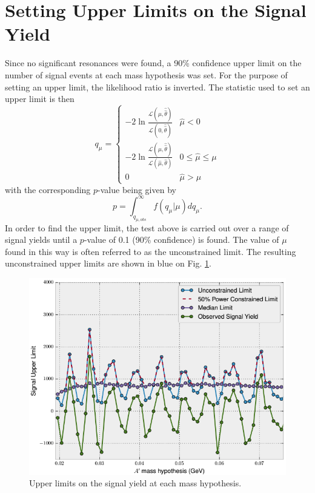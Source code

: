 \section{Setting Upper Limits on the Signal Yield}

Since no significant resonances were found, a 90\% confidence upper limit on the number
of signal events at each mass hypothesis was set.  For the purpose of setting
an upper limit, the likelihood ratio is inverted.  The statistic used
to set an upper limit is then
\begin{equation}
    q_{\mu} = \begin{cases}
        -2 \ln \frac{\mathcal{L}(\mu, \hat{\hat{\theta}})}{\mathcal{L}(0, \hat{\hat{\theta}})} 
            & \hat{\mu} < 0 \\
        -2 \ln \frac{\mathcal{L}(\mu, \hat{\hat{\theta}})}{\mathcal{L}(\hat{\mu}, \hat{\theta})} 
            & 0 \leq \hat{\mu} \leq \mu \\
             0  & \hat{\mu} > \mu
        \end{cases}
\end{equation}
with the corresponding $p$-value being given by
\begin{equation}
    p = \int_{q_{\mu,obs}}^{\infty} f(q_{\mu} | \mu) dq_{\mu}.
\end{equation}
In order to find the upper limit, the test above is carried out over a range of
signal yields until a $p$-value of 0.1 (90\% confidence) is found. The value of
$\mu$ found in this way
is often referred to as the unconstrained limit. The resulting 
unconstrained upper limits are shown in blue on Fig. \ref{fig:upper_limit}. 
\begin{figure}[t]
    \centering
    \includegraphics[width=.8\textwidth]{images/upper_limits.png}
    \caption{Upper limits on the signal yield at each mass hypothesis.}
    \label{fig:upper_limit}
\end{figure}


